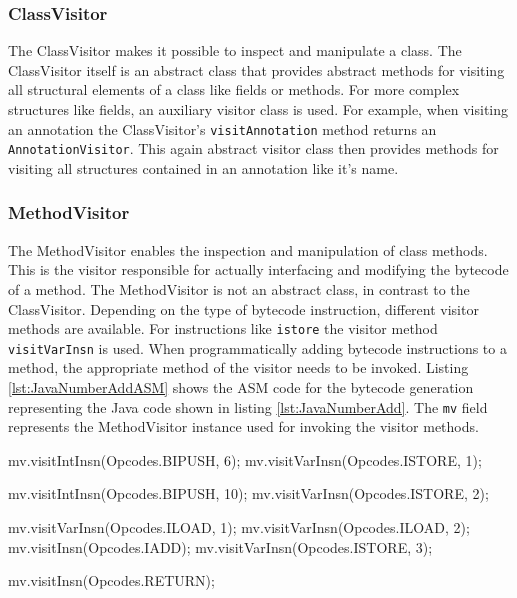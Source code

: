 \subsubsection{ClassVisitor}

The ClassVisitor makes it possible to inspect and manipulate a class. The ClassVisitor itself is an abstract class that provides abstract methods for visiting all structural elements of a class like fields or methods. For more complex structures like fields, an auxiliary visitor class is used. For example, when visiting an annotation the ClassVisitor's \texttt{visitAnnotation} method returns an \texttt{AnnotationVisitor}. This again abstract visitor class then provides methods for visiting all structures contained in an annotation like it's name. 

\subsubsection{MethodVisitor}

The MethodVisitor enables the inspection and manipulation of class methods. This is the visitor responsible for actually interfacing and modifying the bytecode of a method. The MethodVisitor is not an abstract class, in contrast to the ClassVisitor. Depending on the type of bytecode instruction, different visitor methods are available. For instructions like \texttt{istore} the visitor method \texttt{visitVarInsn} is used. When programmatically adding bytecode instructions to a method, the appropriate method of the visitor needs to be invoked. Listing \ref{lst:JavaNumberAddASM} shows the ASM code for the bytecode generation representing the Java code shown in listing \ref{lst:JavaNumberAdd}. The \texttt{mv} field represents the MethodVisitor instance used for invoking the visitor methods.

\begin{JavaCode}[float,numbers=none,caption=ASM code for bytecode generation of the Java program shown in listing \ref{lst:JavaNumberAdd}., label=lst:JavaNumberAddASM]
mv.visitIntInsn(Opcodes.BIPUSH, 6);
mv.visitVarInsn(Opcodes.ISTORE, 1); 

mv.visitIntInsn(Opcodes.BIPUSH, 10);
mv.visitVarInsn(Opcodes.ISTORE, 2); 


mv.visitVarInsn(Opcodes.ILOAD, 1); 
mv.visitVarInsn(Opcodes.ILOAD, 2); 
mv.visitInsn(Opcodes.IADD);        
mv.visitVarInsn(Opcodes.ISTORE, 3);

mv.visitInsn(Opcodes.RETURN);
\end{JavaCode}